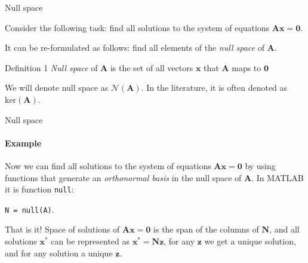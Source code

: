 \documentclass{beamer}
\begin{document}
\begin{frame}{Null space}
\begin{flushleft}

Consider the following task: find all solutions to the system of equations $\mathbf{A} \mathbf{x} = \mathbf{0}$.

\bigskip

It can be re-formulated as follows: find all elements of the \emph{null space} of $\mathbf{A}$.

\begin{block}{Definition 1}
  \emph{Null space} of $\mathbf{A}$ is the set of all vectors $\mathbf{x}$ that $\mathbf{A}$ maps to $\mathbf{0}$
\end{block}

\bigskip

We will denote null space as $\mathcal{N}(\mathbf{A})$. In the literature, it is often denoted as $\text{ker}(\mathbf{A})$.

\end{flushleft}
\end{frame}


\begin{frame}{Null space}
\framesubtitle{Example}
\begin{flushleft}

Now we can find all solutions to the system of equations $\mathbf{A} \mathbf{x} = \mathbf{0}$ by using functions that generate an \emph{orthonormal basis} in the null space of $\mathbf{A}$. In MATLAB it is function \texttt{null}:

\bigskip

\texttt{N = null(A)}.

\bigskip

That is it! Space of solutions of $\mathbf{A} \mathbf{x} = \mathbf{0}$ is the span of the columns of $\mathbf{N}$, and all solutions $\mathbf{x}^*$ can be represented as $\mathbf{x}^* = \mathbf{N}\mathbf{z}$, for any $\mathbf{z}$ we get a unique solution, and for any solution a unique $\mathbf{z}$.

\end{flushleft}
\end{frame}
\end{document}
